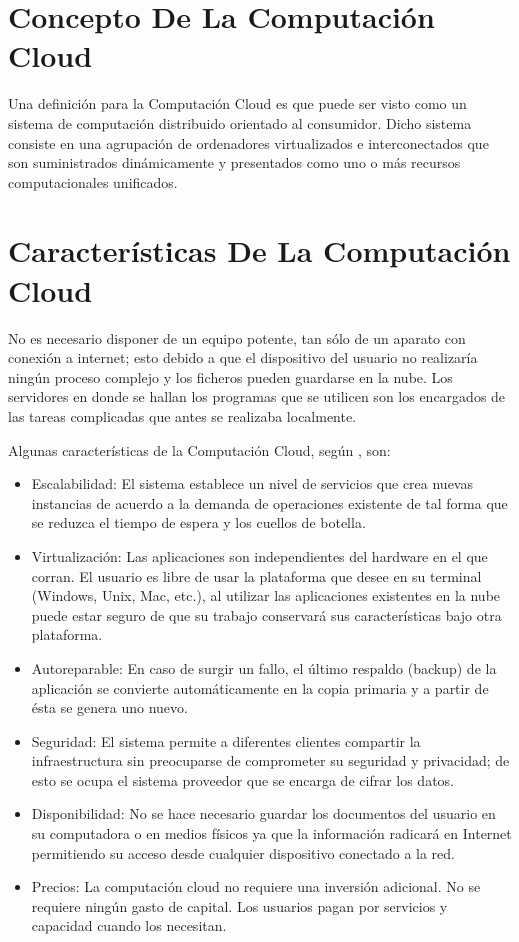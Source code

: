 \documentclass[a4paper, 12pt]{report}
\begin{document}
\section{Concepto De La Computaci\'on Cloud}
\begin{justify}
Una definici\'on para la Computaci\'on Cloud es que puede ser visto como un sistema de computaci\'on distribuido orientado al consumidor. Dicho sistema consiste en una agrupaci\'on de ordenadores virtualizados e interconectados que son suministrados din\'amicamente y presentados como uno o m\'as recursos computacionales unificados.
\end{justify}
\section{Caracter\'isticas De La Computaci\'on Cloud}
\begin{justify}
No es necesario disponer de un equipo potente, tan s\'olo de un aparato con conexi\'on a internet; esto debido a que el dispositivo del usuario no realizar\'ia ning\'un proceso complejo y los ficheros pueden guardarse en la nube. Los servidores en donde se hallan los programas que se utilicen son los encargados de las tareas complicadas que antes se realizaba localmente.
\end{justify}
Algunas caracter\'isticas de la Computaci\'on Cloud, seg\'un \cite{oscarAvilaMejia}, son:
\begin{itemize}
    \item{Escalabilidad:} El sistema establece un nivel de servicios que crea nuevas instancias de acuerdo a la demanda de operaciones existente de tal forma que se reduzca el tiempo de espera y los cuellos de botella.
    \item{Virtualizaci\'on:} Las aplicaciones son independientes del hardware en el que corran. El usuario es libre de usar la plataforma que desee en su terminal (Windows, Unix, Mac, etc.), al utilizar las aplicaciones existentes en la nube puede estar seguro de que su trabajo conservar\'a sus caracter\'isticas bajo otra plataforma.
    \item{Autoreparable:} En caso de surgir un fallo, el \'ultimo respaldo (backup) de la aplicaci\'on se convierte autom\'aticamente en la copia primaria y a partir de \'esta se genera uno nuevo.
    \item{Seguridad:} El sistema permite a diferentes clientes compartir la infraestructura sin preocuparse de comprometer su seguridad y privacidad; de esto se ocupa el sistema proveedor que se encarga de cifrar los datos.
    \item{Disponibilidad:} No se hace necesario guardar los documentos del usuario en su computadora o en medios f\'isicos ya que la informaci\'on radicar\'a en Internet permitiendo su acceso desde cualquier dispositivo conectado a la red.
    \item{Precios:} La computaci\'on cloud no requiere una inversión adicional. No se requiere ning\'un gasto de capital. Los usuarios pagan por servicios y capacidad cuando los necesitan.
\end{itemize}
\end{document}
